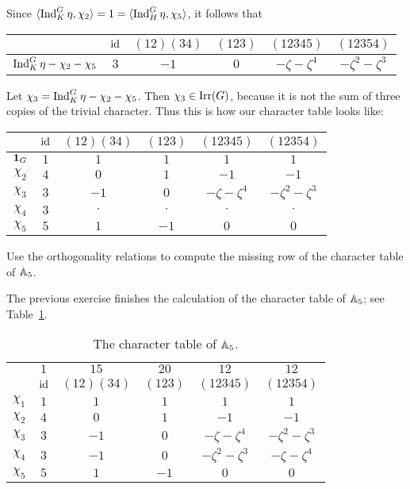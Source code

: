Since 
$\langle\operatorname{Ind}_K^G\eta,\chi_2\rangle=1=\langle\operatorname{Ind}_H^G\eta,\chi_5\rangle$,
it follows that 
\bigskip 
\begin{center}
        \begin{tabular}{|c|ccccc|}
        \hline  
         & $\operatorname{id}$ & $(12)(34)$ & $(123)$ & $(12345)$ & $(12354)$\\
         \hline 
         $\operatorname{Ind}_K^G\eta-\chi_2-\chi_5$ & $3$ & $-1$ & $0$ & $-\zeta-\zeta^4$ & $-\zeta^2-\zeta^3$\\
         \hline 
\end{tabular}
\end{center}
\bigskip 
Let $\chi_3=\operatorname{Ind}_K^G\eta-\chi_2-\chi_5$. Then $\chi_3\in\operatorname{Irr}(G)$, because it is
not the sum of three copies of the trivial character. Thus this is how our character table looks like: 
\bigskip
\begin{center}
        \begin{tabular}{|c|ccccc|}
        \hline  
         & $\operatorname{id}$ & $(12)(34)$ & $(123)$ & $(12345)$ & $(12354)$\\
        \hline 
        $\mathbf{1}_G$ & $1$ & $1$ & $1$ & $1$ & $1$\\
        $\chi_2$ & $4$ & $0$ & $1$ & $-1$ & $-1$\\
        $\chi_3$ & $3$ & $-1$ & $0$ & $-\zeta-\zeta^4$ & $-\zeta^2-\zeta^3$\\
        $\chi_4$ & $3$ & $\cdot$ & $\cdot$ & $\cdot$& $\cdot$\\
        $\chi_5$ & $5$ & $1$ & $-1$ & $0$& $0$\\
        \hline 
    \end{tabular}
\end{center}
\bigskip 

\begin{exercise}
    Use the orthogonality relations
    to compute the missing row of the character table
    of $\mathbb{A}_5$. 
\end{exercise}

The previous exercise finishes the calculation
of the character table of $\mathbb{A}_5$; see Table~\ref{tab:A5}. 


\begin{table}[h]
\caption{The character table of $\mathbb{A}_5$.}
\label{tab:A5}
        \begin{tabular}{|c|ccccc|}
        \hline  
        & $1$ & $15$ & $20$ & $12$ & $12$ \\
         & $\operatorname{id}$ & $(12)(34)$ & $(123)$ & $(12345)$ & $(12354)$\\
        \hline 
        $\chi_1$ & $1$ & $1$ & $1$ & $1$ & $1$\\
        $\chi_2$ & $4$ & $0$ & $1$ & $-1$ & $-1$\\
        $\chi_3$ & $3$ & $-1$ & $0$ & $-\zeta-\zeta^4$ & $-\zeta^2-\zeta^3$\\
        $\chi_4$ & $3$ &  $-1$ & $0$ & $-\zeta^2-\zeta^3$ & $-\zeta-\zeta^4$ \\
        $\chi_5$ & $5$ & $1$ & $-1$ & $0$& $0$\\
        \hline 
    \end{tabular}
\end{table}

